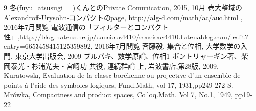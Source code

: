 \documentclass[leqno]{jsarticle}
\begin{document}
	
\begin{thebibliography}{9}
冬(fuyu\_atsusugi\_\_)くんとのPrivate Comunication, 2015, 10月
壱大整域のAlexandroff-Urysohn-コンパクトのpage, http://alg-d.com/math/ac/auc.html , 2016年7月閲覧
電波通信の「フィルターとコンパクト性」,http://blog.hatena.ne.jp/concious4410/concious4410.hatenablog.com/ edit?entry=6653458415125359892, 2016年7月閲覧
斉藤毅, 集合と位相, 大学数学の入門, 東京大学出版会, 2009
ブルバキ、数学原論、位相1
ポントリャーギン著、柴岡泰光・杉浦光夫・宮崎功 共役, 連続群論 上, 岩波書店,第28版, 2009, 
Kuratowski, Evaluation de la classe bor\'elienne ou projective d'un ensemble de points \'a l'aide des symboles logiques, Fund.Math, vol 17, 1931,pp249-272
S. Mr\'owka, Compactness and product spaces, Colloq.Math. Vol 7, No.1, 1949, pp19-22
\end{thebibliography}




			
\end{document}
